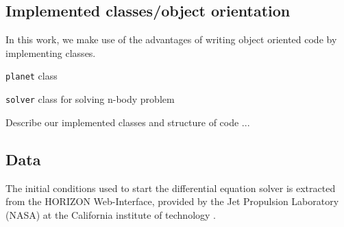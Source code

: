 \documentclass[../main.tex]{subfiles}
\begin{document}
\iffalse
\begin{algorithm}[H]
\SetAlgoLined
 
 \caption{Velocity Verlet}
\end{algorithm}
\fi

\subsection{Implemented classes/object orientation}
In this work, we make use of the advantages of writing object oriented code by implementing classes. 

\texttt{planet} class

\texttt{solver} class for solving n-body problem

Describe our implemented classes and structure of code ... 

\subsection{Data}
The initial conditions used to start the differential equation solver is extracted from the HORIZON Web-Interface, provided by the Jet Propulsion Laboratory (NASA) at the California institute of technology \cite{Horizon}.
\end{document}
